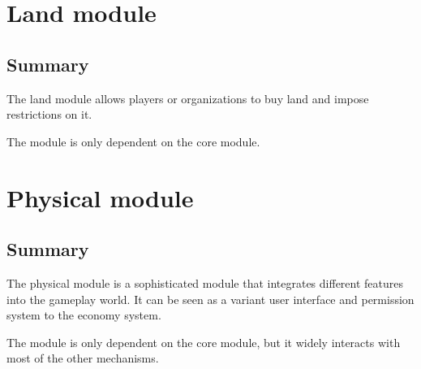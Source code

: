\documentclass{report}
\begin{document}
	\part{Land module}
		\chapter{Summary}

			The land module allows players or organizations to buy land and impose restrictions on it.

			The module is only dependent on the core module.

	\part{Physical module}
		\label{sec:physical-module}
		\chapter{Summary}
			The physical module is a sophisticated module that integrates different features into the gameplay world.
			It can be seen as a variant user interface and permission system to the economy system.

			The module is only dependent on the core module, but it widely interacts with most of the other mechanisms.
\end{document}
